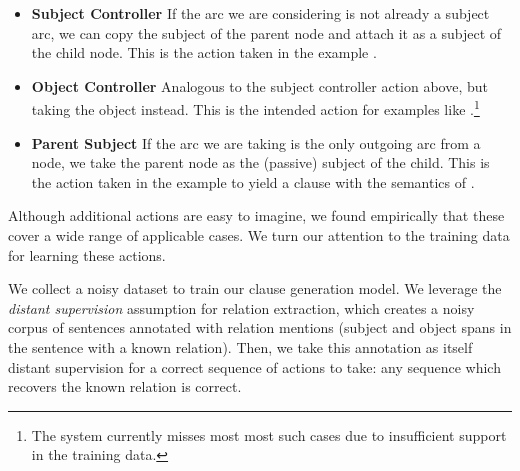 \begin{itemize}[leftmargin=2ex]
\item[] \textbf{Subject Controller}  \hspace{1ex}
  If the arc we are considering is not already a subject arc,
    we can copy the subject of the parent node and attach it as a subject of the
    child node.
  This is the action taken in the example
    .

\item[] \textbf{Object Controller}  \hspace{1ex}
  Analogous to the subject controller action above, but taking the object
    instead.
  This is the intended action for examples like
    .\footnote{
      The system currently misses most most such cases due to insufficient 
      support in the training data.
    }

\item[] \textbf{Parent Subject} \hspace{1ex}
  If the arc we are taking is the only outgoing arc from a node, we take the
    parent node as the (passive) subject of the child.
  This is the action taken in the example
     to yield a clause with the
    semantics of .
\end{itemize}

Although additional actions are easy to imagine, we found empirically that
  these cover a wide range of applicable cases.
We turn our attention to the training data for learning these actions.

%
%
We collect a noisy dataset to train our clause generation model.
We leverage the \textit{distant supervision} assumption for relation extraction,
  which creates a noisy corpus of sentences annotated with relation mentions
  (subject and object spans in the sentence with a known relation).
Then, we take this annotation as itself distant supervision for a correct
  sequence of actions to take: any sequence which recovers the 
  known relation is correct.

